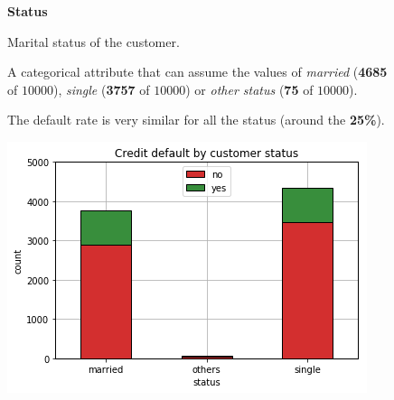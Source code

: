 \smallskip
\begin{figure}[h]
  \begin{minipage}[h]{.50\textwidth}
        {\Large \textbf{Status}}
        
        Marital status of the customer.
        
        A categorical attribute that can assume the values of 
        \textit{married} (\textbf{4685} of $10000$),
        \textit{single} (\textbf{3757} of $10000$) or
        \textit{other status} (\textbf{75} of $10000$).
        
        The default rate is very similar for all the status (around the \textbf{25\%}).
  \end{minipage}
  \begin{minipage}[h]{.50\textwidth}
    \includegraphics[width=.95\textwidth]{img/ch2/status}
  \end{minipage}
\end{figure}

